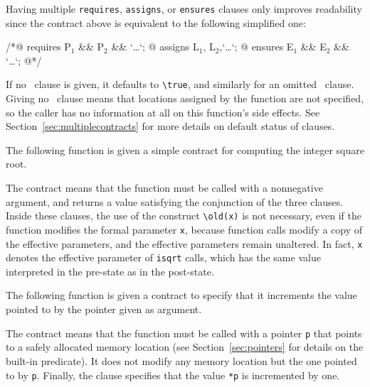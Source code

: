 Having multiple \lstinline|requires|, \lstinline|assigns|, or 
\lstinline|ensures| clauses only improves 
readability since the contract above is equivalent to the following
simplified one:
\begin{listing}{1}
/*@ requires P$_1$ && P$_2$ && `\dots`;
  @ assigns L$_1$, L$_2$,`\dots`;
  @ ensures E$_1$ && E$_2$ && `\dots`;
  @*/
\end{listing}
If no \requires\ clause is given, it defaults to
\lstinline!\true!, and similarly for an omitted \ensures\ clause.
Giving no \assigns\ clause
means that locations assigned by the function are not specified, so
the caller has no information at all on this function's side
effects. See Section~\ref{sec:multiplecontracts} for more details on
default status of clauses.

\begin{example}
  The following function is given a simple contract for computing
  the integer square root.

%
  The contract means that the function must be called with a
  nonnegative argument, and returns a value satisfying
  the conjunction of the three \ensures{} clauses.
  Inside these \ensures{} clauses, the use of the construct \lstinline|\old(x)|
  is not necessary, even if the function modifies the formal
  parameter
  \lstinline|x|, because function calls modify a copy of the effective parameters,
  and the effective parameters remain unaltered.  In fact, \lstinline|x| denotes
  the effective parameter of \lstinline|isqrt| calls, which has the same value
  interpreted in the pre-state as in the post-state.

\end{example}

\begin{example}
  The following function is given a contract to specify that it increments
  the value pointed to by the pointer given as argument.

%
  The contract means that the function must be called with a pointer
  \lstinline|p| that points to a safely allocated memory location (see
  Section~\ref{sec:pointers} for details on the \valid built-in
  predicate). It does not modify any memory location but the one
  pointed to by \lstinline|p|. Finally, the \ensures clause specifies that
  the value \lstinline!*p! is incremented by one.
\end{example}


